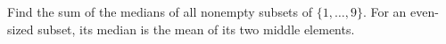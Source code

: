 Find the sum of the medians of all nonempty subsets of $\{1,\ldots,9\}$. For an even-sized subset, its median is the mean of its two middle elements.
